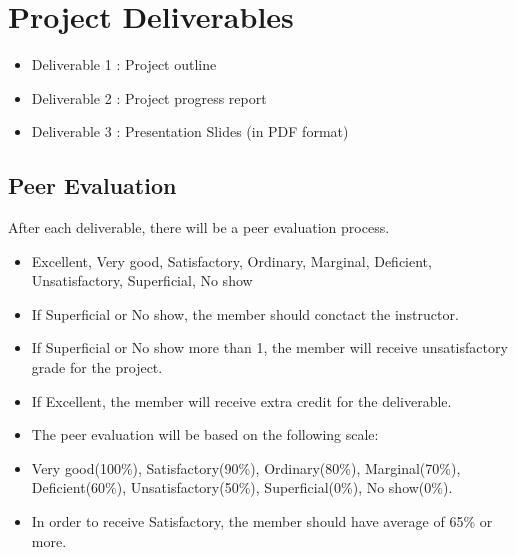 \documentclass{article}
\begin{document}
\section*{Project Deliverables}
\begin{itemize}
    \item Deliverable 1 : Project outline 
    \item Deliverable 2 : Project progress report
    \item Deliverable 3 : Presentation Slides (in PDF format)
\end{itemize}



\subsection*{Peer Evaluation}
After each deliverable, there will be a peer evaluation process.
\begin{itemize}
    \item Excellent, Very good, Satisfactory, Ordinary, Marginal, Deficient, Unsatisfactory, Superficial, No show
    \item If Superficial or No show, the member should conctact the instructor.
    \item If Superficial or No show more than 1, the member will receive unsatisfactory grade for the project.
    \item If Excellent, the member will receive extra credit for the deliverable.
    \item The peer evaluation will be based on the following scale:
    \item Very good(100\%), Satisfactory(90\%), Ordinary(80\%), Marginal(70\%), Deficient(60\%), Unsatisfactory(50\%), Superficial(0\%), No show(0\%).
    \item In order to receive Satisfactory, the member should have average of 65\% or more. 
\end{itemize}
\end{document}
